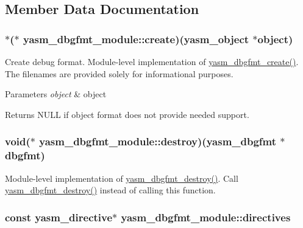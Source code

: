 \subsection{Member Data Documentation}
\hypertarget{structyasm__dbgfmt__module_aabd6277bd3da3ecf5446b41e77fa9848}{
\subsubsection[{create}]{$\ast$($\ast$ yasm\-\_\-dbgfmt\-\_\-module\-::create)({\bf yasm\-\_\-object} $\ast$object)}}\label{structyasm__dbgfmt__module_aabd6277bd3da3ecf5446b41e77fa9848}
Create debug format. Module-\/level implementation of \hyperlink{dbgfmt_8h_a3c0f8c26b33381bac6c34f14a0f31640}{yasm\-\_\-dbgfmt\-\_\-create()}. The filenames are provided solely for informational purposes. 
\begin{DoxyParams}{Parameters}
{\em object} & object \\
\hline
\end{DoxyParams}
\begin{DoxyReturn}{Returns}
N\-U\-L\-L if object format does not provide needed support. 
\end{DoxyReturn}
\hypertarget{structyasm__dbgfmt__module_a490ee31a6d35fdfbddbf659badd6f2c0}{
\subsubsection[{destroy}]{\setlength{\rightskip}{0pt plus 5cm}void($\ast$ yasm\-\_\-dbgfmt\-\_\-module\-::destroy)({\bf yasm\-\_\-dbgfmt} $\ast$dbgfmt)}}\label{structyasm__dbgfmt__module_a490ee31a6d35fdfbddbf659badd6f2c0}
Module-\/level implementation of \hyperlink{dbgfmt_8h_a252fb4ed10fd455def43b31fd7f5d2eb}{yasm\-\_\-dbgfmt\-\_\-destroy()}. Call \hyperlink{dbgfmt_8h_a252fb4ed10fd455def43b31fd7f5d2eb}{yasm\-\_\-dbgfmt\-\_\-destroy()} instead of calling this function. \hypertarget{structyasm__dbgfmt__module_a061ba535cfefaf4d51d05aca6b90058e}{
\subsubsection[{directives}]{\setlength{\rightskip}{0pt plus 5cm}const {\bf yasm\-\_\-directive}$\ast$ yasm\-\_\-dbgfmt\-\_\-module\-::directives}}\label{structyasm__dbgfmt__module_a061ba535cfefaf4d51d05aca6b90058e}
